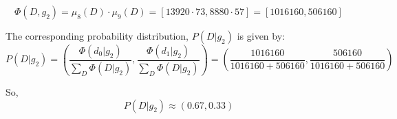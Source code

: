 \documentclass[11pt,a4paper]{article}
\begin{document}
	$$ \Phi(D, g_2) = \mu_8(D) \cdot \mu_9(D) = [13920 \cdot 73, 8880 \cdot 57] = [1016160, 506160] $$
	
	The corresponding probability distribution, $P(D | g_2)$ is given by:
	$$ P(D | g_2) = \left(\frac{\Phi(d_0 | g_2)}{\sum_{D}\Phi(D | g_2)}, \frac{\Phi(d_1 | g_2)}{\sum_{D}\Phi(D | g_2)}\right) = \left(\frac{1016160}{1016160+506160},\frac{506160}{1016160+506160}\right) $$
	
	So,
	$$ P(D | g_2) \approx (0.67,0.33) $$
	
	
	
	
\end{document}
